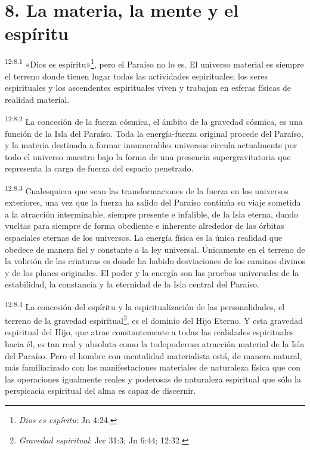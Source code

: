 \section*{8. La materia, la mente y el espíritu}
\par
\textsuperscript{12:8.1} «Dios es espíritu»\footnote{\textit{Dios es espíritu}: Jn 4:24.}, pero el Paraíso no lo es. El universo material es siempre el terreno donde tienen lugar todas las actividades espirituales; los seres espirituales y los ascendentes espirituales viven y trabajan en esferas físicas de realidad material.

\par
\textsuperscript{12:8.2} La concesión de la fuerza cósmica, el ámbito de la gravedad cósmica, es una función de la Isla del Paraíso. Toda la energía-fuerza original procede del Paraíso, y la materia destinada a formar innumerables universos circula actualmente por todo el universo maestro bajo la forma de una presencia supergravitatoria que representa la carga de fuerza del espacio penetrado.

\par
\textsuperscript{12:8.3} Cualesquiera que sean las transformaciones de la fuerza en los universos exteriores, una vez que la fuerza ha salido del Paraíso continúa su viaje sometida a la atracción interminable, siempre presente e infalible, de la Isla eterna, dando vueltas para siempre de forma obediente e inherente alrededor de las órbitas espaciales eternas de los universos. La energía física es la única realidad que obedece de manera fiel y constante a la ley universal. Únicamente en el terreno de la volición de las criaturas es donde ha habido desviaciones de los caminos divinos y de los planes originales. El poder y la energía son las pruebas universales de la estabilidad, la constancia y la eternidad de la Isla central del Paraíso.

\par
\textsuperscript{12:8.4} La concesión del espíritu y la espiritualización de las personalidades, el terreno de la gravedad espiritual\footnote{\textit{Gravedad espiritual}: Jer 31:3; Jn 6:44; 12:32.}, es el dominio del Hijo Eterno. Y esta gravedad espiritual del Hijo, que atrae constantemente a todas las realidades espirituales hacia él, es tan real y absoluta como la todopoderosa atracción material de la Isla del Paraíso. Pero el hombre con mentalidad materialista está, de manera natural, más familiarizado con las manifestaciones materiales de naturaleza física que con las operaciones igualmente reales y poderosas de naturaleza espiritual que sólo la perspicacia espiritual del alma es capaz de discernir.

